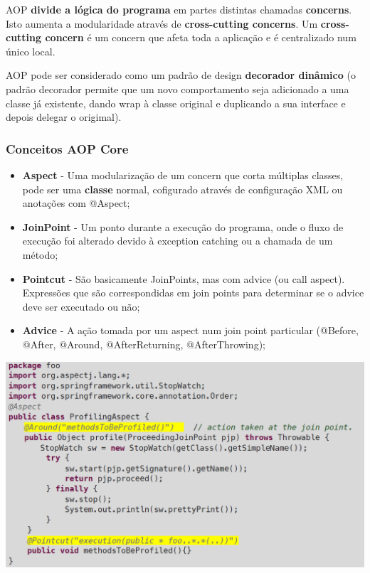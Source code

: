 \documentclass{article}
\begin{document}
AOP \textbf{divide a lógica do programa} em partes distintas chamadas
\textbf{concerns}. Isto aumenta a modularidade através de
\textbf{cross-cutting concerns}. Um \textbf{cross-cutting concern}
é um concern que afeta toda a aplicação e é centralizado
num único local.

AOP pode ser considerado como um padrão de design \textbf{decorador
dinâmico} (o padrão decorador permite que um novo comportamento
seja adicionado a uma classe já existente, dando wrap à classe
original e duplicando a sua interface e depois delegar o origimal).

\subsubsection*{Conceitos AOP Core}

\begin{itemize}
  \item \textbf{Aspect} - Uma modularização de um concern que corta
  múltiplas classes, pode ser uma \textbf{classe} normal,
  cofigurado através de configuração XML ou anotações com @Aspect;
  \item \textbf{JoinPoint} - Um ponto durante a execução do programa,
  onde o fluxo de execução foi alterado devido à exception catching
  ou a chamada de um método;
  \item \textbf{Pointcut} - São basicamente JoinPoints, mas com
  advice (ou call aspect). Expressões que são correspondidas
  em join points para determinar se o advice deve ser executado
  ou não;
  \item \textbf{Advice} - A ação tomada por um aspect num join point
  particular (@Before, @After, @Around, @AfterReturning, @AfterThrowing);
\end{itemize}

\pagebreak

\begin{center}
  \includegraphics[scale=0.35]{86}
\end{center}
\end{document}
